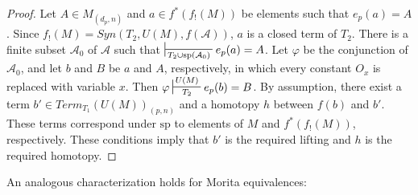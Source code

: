 \documentclass[reqno]{amsart}
\theoremstyle{definition}
\theoremstyle{remark}
\numberwithin{figure}{section}
\begin{document}
\begin{proof}
Let $A \in M_{(d_p,n)}$ and $a \in f^*(f_!(M))$ be elements such that $e_p(a) = A$.
Since $f_!(M) = Syn(T_2, U(M), f(\mathcal{A}))$, $a$ is a closed term of $T_2$.
There is a finite subset $\mathcal{A}_0$ of $\mathcal{A}$ such that $\sststile{T_2 \cup \mathrm{sp}(\mathcal{A}_0)}{} e_p(a) = A$.
Let $\varphi$ be the conjunction of $\mathcal{A}_0$, and let $b$ and $B$ be $a$ and $A$, respectively, in which every constant $O_x$ is replaced with variable $x$.
Then $\varphi \sststile{T_2}{U(M)} e_p(b) = B$.
By assumption, there exist a term $b' \in Term_{T_1}(U(M))_{(p,n)}$ and a homotopy $h$ between $f(b)$ and $b'$.
These terms correspond under $\mathrm{sp}$ to elements of $M$ and $f^*(f_!(M))$, respectively.
These conditions imply that $b'$ is the required lifting and $h$ is the required homotopy.
\end{proof}

An analogous characterization holds for Morita equivalences:
\end{document}
